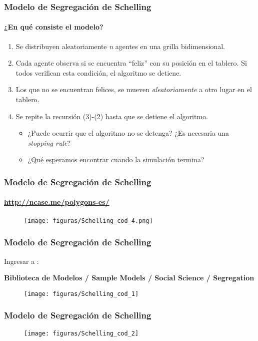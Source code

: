 \documentclass[11pt]{beamer}
\begin{document}
\begin{frame}
	\frametitle{Modelo de Segregación de Schelling}
	\framesubtitle{¿En qué consiste el modelo?}

\begin{enumerate}
	\item Se distribuyen aleatoriamente \textit{n} agentes en una grilla bidimensional.
	\item Cada agente observa si se encuentra ``feliz'' con su posición en el tablero. Si todos verifican esta condición, el algoritmo se detiene.
	\item Los que no se encuentran felices, se mueven \textit{aleatoriamente} a otro lugar en el tablero.
	\item Se repite la recursión (3)-(2) hasta que se detiene el algoritmo.
	\begin{itemize}
		\item ¿Puede ocurrir que el algoritmo no se detenga? ¿Es necesaria una \textit{stopping rule}?
		\item ¿Qué esperamos encontrar cuando la simulación termina?
	\end{itemize}
\end{enumerate}
\end{frame}

\begin{frame}
	\frametitle{Modelo de Segregación de Schelling}
	\framesubtitle{\url{http://ncase.me/polygons-es/}}
	\begin{figure}
		\centering
		\texttt{[image: figuras/Schelling\_cod\_4.png]}
		\label{fig:schellingcod4}
	\end{figure}
\end{frame}

\begin{frame}
	\frametitle{Modelo de Segregación de Schelling}
Ingresar a :

 \textbf{Biblioteca de Modelos / Sample Models / Social Science / Segregation}
\begin{figure}
	\centering
	\texttt{[image: figuras/Schelling\_cod\_1]}
	\label{fig:schellingcod1}
\end{figure}
\end{frame}

\begin{frame}
	\frametitle{Modelo de Segregación de Schelling}
	\begin{figure}
		\centering
		\texttt{[image: figuras/Schelling\_cod\_2]}
		\label{fig:schellingcod2}
	\end{figure}
\end{frame}
\end{document}

